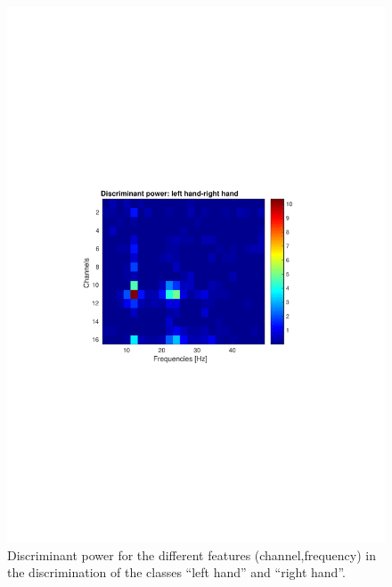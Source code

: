 \begin{figure}[h!]
   \centering
   \includegraphics[width = \textwidth]{images/DP_LHRH.pdf}
   \caption{Discriminant power for the different features (channel,frequency) in the discrimination of the classes ``left hand'' and ``right hand''.}
   \label{fig:DP_LHRH}
\end{figure}
